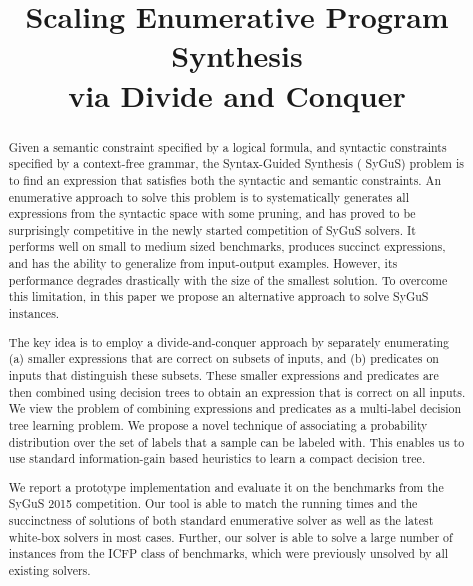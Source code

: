 \documentclass{llncs}
\newcommand\arsays[1]{{\bf AR: #1}}
\newcommand{\sygus}{{\sffamily\fontsize{8.5}{10}\selectfont
    SyGuS}\xspace}
\begin{document}


\pagestyle{plain}
\title{Scaling Enumerative Program Synthesis\\via Divide and Conquer}
\author{}
\institute{}
\maketitle
\vspace*{-6ex}

\begin{abstract}
  Given a semantic constraint specified by a logical formula, and
  syntactic constraints specified by a context-free grammar, the
  Syntax-Guided Synthesis (\sygus) problem is to find an expression
  that satisfies both the syntactic and semantic constraints.
  An enumerative approach to solve this problem is to systematically
  generates all expressions from the syntactic space with some pruning,
  and has proved to be surprisingly competitive in the newly started
  competition of \sygus solvers.  It performs well on small to medium sized
  benchmarks, produces succinct expressions, and has the ability to
  generalize from input-output examples.  However, its performance
  degrades drastically with the size of the smallest solution. To overcome
  this limitation, in this paper we propose an alternative approach to
  solve \sygus instances.

  The key idea  is to employ a divide-and-conquer approach by
  separately enumerating (a) smaller expressions that are correct on
  subsets of inputs, and (b) predicates on inputs that distinguish these
  subsets.  These smaller expressions and predicates are then combined
  using decision trees to obtain an expression that is correct on all
  inputs.  We view the problem of combining expressions and predicates as
  a multi-label decision tree learning problem. We propose a novel
  technique of associating a probability distribution over the set of
  labels that a sample can be labeled with. This enables us to use
  standard information-gain based heuristics to learn a compact decision
  tree.

  We report a prototype implementation and evaluate it on the benchmarks
  from the \sygus 2015 competition. Our tool is able to match the running
  times and the succinctness of solutions of both standard enumerative
  solver as well as the latest white-box solvers in most cases.  Further,
  our solver is able to solve a large number of instances from the ICFP
  class of benchmarks, which were previously unsolved by all existing
  solvers.
\end{abstract}
\end{document}
